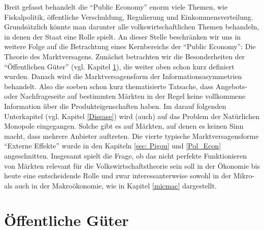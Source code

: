 Breit gefasst behandelt die "`Public Economy"' enorm viele Themen, wie Fiskalpolitik, öffentliche Verschuldung, Regulierung und Einkommensverteilung. Grundsätzlich könnte man darunter alle volkswirtschaftlichen Themen behandeln, in denen der Staat eine Rolle spielt. An dieser Stelle beschränken wir uns in weitere Folge auf die Betrachtung eines Kernbereichs der "`Public Economy"': Die Theorie des Marktversagens. Zunächst betrachten wir die Besonderheiten der "`Öffentlichen Güter"' (vgl. Kapitel \ref{Offentliche Guter}), die weiter oben schon kurz definiert wurden. Danach wird die Marktversagensform der Informationsasymmetrien behandelt. Also die soeben schon kurz thematisierte Tatsache, dass Angebots- oder Nachfrageseite auf bestimmten Märkten in der Regel keine vollkommene Information über die Produkteigenschaften haben. Im darauf folgenden Unterkapitel (vgl. Kapitel \ref{Disease}) wird (auch) auf das Problem der Natürlichen Monopole eingegangen. Solche gibt es auf Märkten, auf denen es keinen Sinn macht, dass mehrere Anbieter auftreten. Die vierte typische Marktversagensforme "`Externe Effekte"' wurde in den Kapiteln \ref{sec: Pigou} und \ref{Pol_Econ} angeschnitten. Insgesamt spielt die Frage, ob das nicht perfekte Funktionieren von Märkten relevant für die Volkswirtschaftstheorie sein soll in der Ökonomie bis heute eine entscheidende Rolle und zwar interessanterweise sowohl in der Mikro- als auch in der Makroökonomie, wie in Kapitel \ref{micmac} dargestellt.


\section{Öffentliche Güter}
\label{Offentliche Guter}

